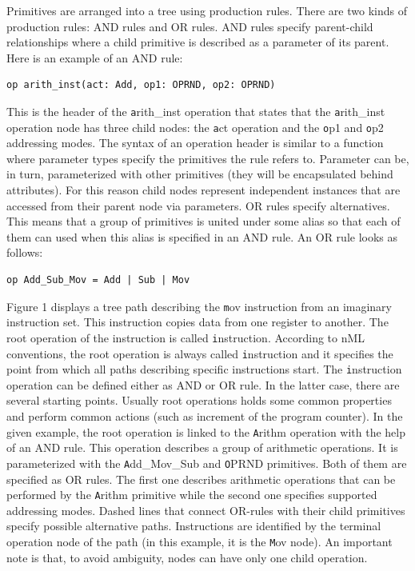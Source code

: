 Primitives are arranged into a tree using production rules. There are two kinds
of production rules: AND rules and OR rules. AND rules specify parent-child
relationships where a child primitive is described as a parameter of its
parent. Here is an example of an AND rule:

\begin{lstlisting}
op arith_inst(act: Add, op1: OPRND, op2: OPRND)
\end{lstlisting}

This is the header of the {\texttt arith{\_}inst} operation that states that the
{\texttt arith{\_}inst} operation node has three child nodes: the {\texttt act} operation and the
{\texttt op1} and {\texttt op2} addressing modes. The syntax of an operation header is similar
to a function where parameter types specify the primitives the rule refers to.
Parameter can be, in turn, parameterized with other primitives (they will be
encapsulated behind attributes). For this reason child nodes represent
independent instances that are accessed from their parent node via parameters.
OR rules specify alternatives. This means that a group of primitives is united
under some alias so that each of them can used when this alias is specified in
an AND rule. An OR rule looks as follows:

\begin{lstlisting}
op Add_Sub_Mov = Add | Sub | Mov
\end{lstlisting}

Figure 1 displays a tree path describing the {\texttt mov} instruction from an
imaginary instruction set. This instruction copies data from one register to
another. The root operation of the instruction is called {\texttt instruction}.
According to nML conventions, the root operation is always called {\texttt instruction}
and it specifies the point from which all paths describing specific
instructions start. The {\texttt instruction} operation can be defined either as AND or
OR rule. In the latter case, there are several starting points. Usually root
operations holds some common properties and perform common actions (such as
increment of the program counter). In the given example, the root operation is
linked to the {\texttt Arithm} operation with the help of an AND rule. This operation
describes a group of arithmetic operations. It is parameterized with the
{\texttt Add{\_}Mov{\_}Sub} and {\texttt OPRND} primitives. Both of them are specified as OR rules.
The first one describes arithmetic operations that can be performed by the
{\texttt Arithm} primitive while the second one specifies supported addressing modes.
Dashed lines that connect OR-rules with their child primitives specify possible
alternative paths. Instructions are identified by the terminal operation node of
the path (in this example, it is the {\texttt Mov} node). An important note is that, to
avoid ambiguity, nodes can have only one child operation.

